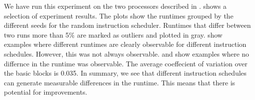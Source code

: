 We have run this experiment on the two processors described in .
 shows a selection of experiment results.
The plots show the runtimes grouped by the different seeds for the random instruction scheduler.
Runtimes that differ between two runs more than 5\% are marked as outliers and plotted in gray.
 show examples where different runtimes are clearly observable for different instruction schedules.
However, this was not always observable.
 and  show examples where no differnce in the runtime was observable.
The average coeffecient of variation over the basic blocks is 0.035.
In summary, we see that different instruction schedules can generate measurable differences in the runtime.
This means that there is potential for improvements.
